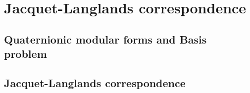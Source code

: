 \newpage
\section{Jacquet-Langlands correspondence}

\subsection{Quaternionic modular forms and Basis problem}
\cite{martin2020basis}

\subsection{Jacquet-Langlands correspondence}